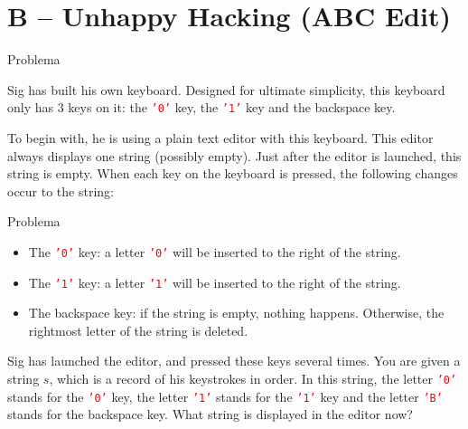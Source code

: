 \section{B -- Unhappy Hacking (ABC Edit)}

\begin{frame}[fragile]{Problema}

Sig has built his own keyboard. Designed for ultimate simplicity, this keyboard only has 3 keys on
it: the \texttt{\textcolor{red}{'0'}} key, the \texttt{\textcolor{red}{'1'}} key and the backspace
key.

To begin with, he is using a plain text editor with this keyboard. This editor always displays one
string (possibly empty). Just after the editor is launched, this string is empty. When each key on
the keyboard is pressed, the following changes occur to the string:

\end{frame}

\begin{frame}[fragile]{Problema}

\begin{itemize}
    \item The \texttt{\textcolor{red}{'0'}} key: a letter \texttt{\textcolor{red}{'0'}} will be
        inserted to the right of the string.
    \item The \texttt{\textcolor{red}{'1'}} key: a letter \texttt{\textcolor{red}{'1'}} will be
        inserted to the right of the string.
    \item The backspace key: if the string is empty, nothing happens. Otherwise, the rightmost
        letter of the string is deleted.
\end{itemize}

Sig has launched the editor, and pressed these keys several times. You are given a string $s$,
which is a record of his keystrokes in order. In this string, the letter
\texttt{\textcolor{red}{'0'}} stands for the \texttt{\textcolor{red}{'0'}} key, the letter
\texttt{\textcolor{red}{'1'}} stands for the \texttt{\textcolor{red}{'1'}} key and the letter
\texttt{\textcolor{red}{'B'}} stands for the backspace key. What string is displayed in the editor
now?

\end{frame}

